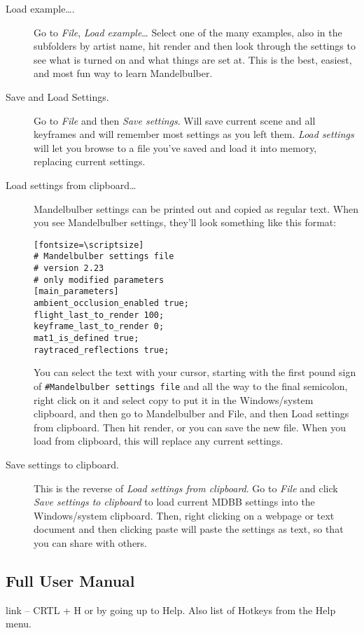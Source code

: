 \begin{description}
	\item[Load example….] Go to \emph{File}, \emph{Load example}… Select one of the many examples, also in the subfolders by artist name, hit render and then look through the settings to see what is turned on and what things are set at. This is the best, easiest, and most fun way to learn Mandelbulber. 

	\item[Save and Load Settings.] Go to \emph{File} and then \emph{Save settings}. Will save current scene and all keyframes and will remember most settings as you left them. \emph{Load settings} will let you browse to a file you’ve saved and load it into memory, replacing current settings. 

	\item[Load settings from clipboard…] Mandelbulber settings can be printed out and copied as regular text. When you see Mandelbulber settings, they’ll look something like this format:
	
	\begin{verbatim}[fontsize=\scriptsize]
# Mandelbulber settings file
# version 2.23
# only modified parameters
[main_parameters]
ambient_occlusion_enabled true;
flight_last_to_render 100;
keyframe_last_to_render 0;
mat1_is_defined true;
raytraced_reflections true; 
	\end{verbatim}

	You can select the text with your cursor, starting with the first pound sign of \texttt{\#Mandelbulber settings file} and all the way to the final semicolon, right click on it and select copy to put it in the Windows/system clipboard, and then go to Mandelbulber and File, and then Load settings from clipboard. Then hit render, or you can save the new file. When you load from clipboard, this will replace any current settings. 

    \item[Save settings to clipboard.] This is the reverse of \emph{Load settings from clipboard}. Go to \emph{File} and click \emph{Save settings to clipboard} to load current MDBB settings into the Windows/system clipboard. Then, right clicking on a webpage or text document and then clicking paste will paste the settings as text, so that you can share with others. 
        
\end{description}

\subsection{Full User Manual}\label{qsg-help}
 link – CRTL + H or by going up to Help. Also list of Hotkeys from the Help menu.



